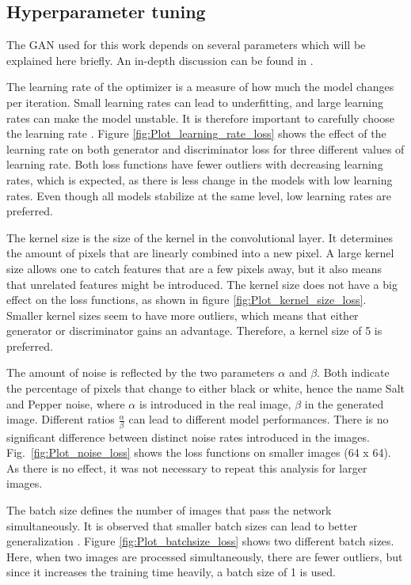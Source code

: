 \subsection{Hyperparameter tuning}
The GAN used for this work depends on several parameters which will be explained here briefly. An in-depth discussion can be found in \cite{murphy2022probabilistic}.

The learning rate of the optimizer is a measure of how much the model changes per iteration. Small learning rates can lead to underfitting, and large learning rates can make the model unstable. It is therefore important to carefully choose the learning rate \cite{murphy2022probabilistic}. Figure \ref{fig:Plot_learning_rate_loss} shows the effect of the learning rate on both generator and discriminator loss for three different values of learning rate. Both loss functions have fewer outliers with decreasing learning rates, which is expected, as there is less change in the models with low learning rates. Even though all models stabilize at the same level, low learning rates are preferred.

The kernel size is the size of the kernel in the convolutional layer. It determines the amount of pixels that are linearly combined into a new pixel. A large kernel size allows one to catch features that are a few pixels away, but it also means that unrelated features might be introduced. The kernel size does not have a big effect on the loss functions, as shown in figure \ref{fig:Plot_kernel_size_loss}. Smaller kernel sizes seem to have more outliers, which means that either generator or discriminator gains an advantage. Therefore, a kernel size of 5 is preferred.

The amount of noise is reflected by the two parameters $\alpha$ and $\beta$. Both indicate the percentage of pixels that change to either black or white, hence the name Salt and Pepper noise, where $\alpha$ is introduced in the real image, $\beta$ in the generated image. Different ratios $\frac{\alpha}{\beta}$ can lead to different model performances. There is no significant difference between distinct noise rates introduced in the images. Fig.~\ref{fig:Plot_noise_loss} shows the loss functions on smaller images (64 x 64). As there is no effect, it was not necessary to repeat this analysis for larger images. 

The batch size defines the number of images that pass the network simultaneously. It is observed that smaller batch sizes can lead to better generalization \cite{prince2023understanding}. Figure \ref{fig:Plot_batchsize_loss} shows two different batch sizes. Here, when two images are processed simultaneously, there are fewer outliers, but since it increases the training time heavily, a batch size of 1 is used.

